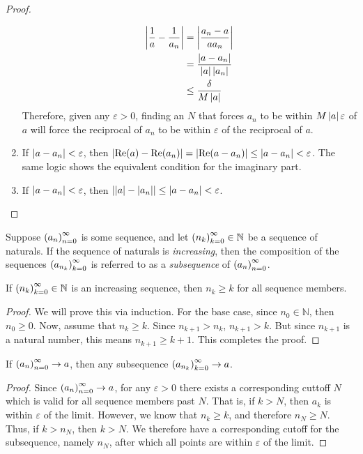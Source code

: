 \begin{proof}
\begin{enumerate}
\begin{align*}
\left\lvert \frac{1}{a}-\frac{1}{a_n} \right\rvert &= \left\lvert \frac{a_n-a}{aa_n} \right\rvert\\
&= \frac{\left\lvert a-a_n \right\rvert}{\left\lvert a \right\rvert{\left\lvert a_n \right\rvert}}\\
&\leq \frac{\delta}{M\left\lvert a \right\rvert}
\end{align*}
Therefore, given any $\varepsilon > 0$, finding an $N$ that forces $a_n$ to be within $M\left\lvert a \right\rvert\varepsilon$ of $a$ will force the reciprocal of $a_n$ to be within $\varepsilon$ of the reciprocal of $a$.
\item If $\left\lvert a-a_n \right\rvert < \varepsilon$, then $\left\lvert \operatorname{Re}({a})-\operatorname{Re}({a_n}) \right\rvert = \left\lvert \operatorname{Re}({a-a_n}) \right\rvert \leq \left\lvert a-a_n \right\rvert < \varepsilon$. The same logic shows the equivalent condition for the imaginary part.
\item If $\left\lvert a-a_n \right\rvert < \varepsilon$, then $\left\lvert \left\lvert a \right\rvert-\left\lvert a_n \right\rvert \right\rvert \leq \left\lvert a-a_n \right\rvert < \varepsilon$.
\end{enumerate}
\end{proof}
\begin{definition}[Subsequence]
Suppose $\seq{a}$ is some sequence, and let $\seq{n}[k]\in \mathbb{N}$ be a sequence of naturals. If the sequence of naturals is \emph{increasing}, then the composition of the sequences $\seq{a}[n_k][k]$ is referred to as a \emph{subsequence} of $\seq{a}$.
\end{definition}
\begin{lemma}
If $\seq{n}[k] \in \mathbb{N}$ is an increasing sequence, then $n_k \geq k$ for all sequence members.
\end{lemma}
\begin{proof}
We will prove this via induction. For the base case, since $n_0 \in \mathbb{N}$, then $n_0 \geq 0$. Now, assume that $n_k \geq k$. Since $n_{k+1} > n_k$, $n_{k+1} > k$. But since $n_{k+1}$ is a natural number, this means $n_{k+1} \geq k+1$. This completes the proof.
\end{proof}
\begin{theorem}
If $\seq{a} \to a$, then any subsequence $\seq{a}[n_k][k] \to a$.
\end{theorem}
\begin{proof}
Since $\seq{a} \to a$, for any $\varepsilon > 0$ there exists a corresponding cuttoff $N$ which is valid for all sequence members past $N$. That is, if $k > N$, then $a_k$ is within $\varepsilon$ of the limit. However, we know that $n_k \geq k$, and therefore $n_N \geq N$. Thus, if $k > n_N$, then $k > N$. We therefore have a corresponding cutoff for the subsequence, namely $n_N$, after which all points are within $\varepsilon$ of the limit.
\end{proof}
